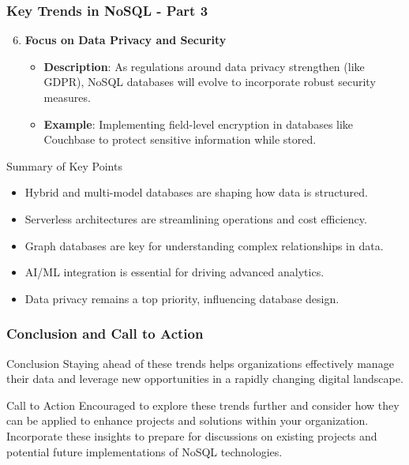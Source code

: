 \documentclass[aspectratio=169]{beamer}
\begin{document}
\begin{frame}[fragile]
    \frametitle{Key Trends in NoSQL - Part 3}
    \begin{enumerate}
        \setcounter{enumi}{5} %
        \item \textbf{Focus on Data Privacy and Security}
        \begin{itemize}
            \item \textbf{Description}: As regulations around data privacy strengthen (like GDPR), NoSQL databases will evolve to incorporate robust security measures.
            \item \textbf{Example}: Implementing field-level encryption in databases like Couchbase to protect sensitive information while stored.
        \end{itemize}
    \end{enumerate}
    
    \begin{block}{Summary of Key Points}
        \begin{itemize}
            \item Hybrid and multi-model databases are shaping how data is structured.
            \item Serverless architectures are streamlining operations and cost efficiency.
            \item Graph databases are key for understanding complex relationships in data.
            \item AI/ML integration is essential for driving advanced analytics.
            \item Data privacy remains a top priority, influencing database design.
        \end{itemize}
    \end{block}
\end{frame}

\begin{frame}[fragile]
    \frametitle{Conclusion and Call to Action}
    \begin{block}{Conclusion}
        Staying ahead of these trends helps organizations effectively manage their data and leverage new opportunities in a rapidly changing digital landscape.
    \end{block}
    
    \begin{block}{Call to Action}
        Encouraged to explore these trends further and consider how they can be applied to enhance projects and solutions within your organization. Incorporate these insights to prepare for discussions on existing projects and potential future implementations of NoSQL technologies.
    \end{block}
\end{frame}
\end{document}
